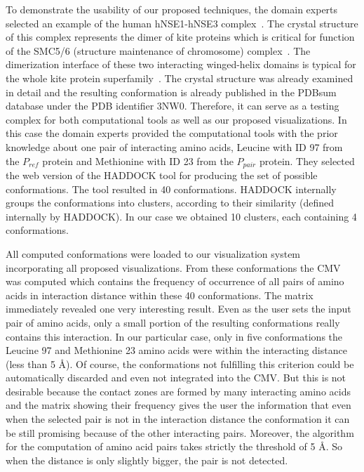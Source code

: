 \documentclass[journal]{vgtc}                %
\begin{document}
To demonstrate the usability of our proposed techniques, the domain experts selected an example of the human hNSE1-hNSE3 complex~\cite{Doyle2010}.
The crystal structure of this complex represents the dimer of kite proteins which is critical for function of the SMC5/6 (structure maintenance of chromosome) complex~\cite{Zabrady2016}. 
The dimerization interface of these two interacting winged-helix domains is typical for the whole kite protein superfamily~\cite{Palecek2015}.
The crystal structure was already examined in detail and the resulting conformation is already published in the PDBsum database under the PDB identifier 3NW0. 
Therefore, it can serve as a testing complex for both computational tools as well as our proposed visualizations.
In this case the domain experts provided the computational tools with the prior knowledge about one pair of interacting amino acids, Leucine with ID 97 from the $P_{ref}$ protein and Methionine with ID 23 from the $P_{pair}$ protein.
They selected the web version of the HADDOCK tool for producing the set of possible conformations. 
The tool resulted in 40 conformations.
HADDOCK internally groups the conformations into clusters, according to their similarity (defined internally by HADDOCK).
In our case we obtained 10 clusters, each containing 4 conformations.

All computed conformations were loaded to our visualization system incorporating all proposed visualizations.
From these conformations the CMV was computed which contains the frequency of occurrence of all pairs of amino acids in interaction distance within these 40 conformations.
The matrix immediately revealed one very interesting result.
Even as the user sets the input pair of amino acids, only a small portion of the resulting conformations really contains this interaction.
In our particular case, only in five conformations the Leucine 97 and Methionine 23 amino acids were within the interacting distance (less than 5 \AA ).
Of course, the conformations not fulfilling this criterion could be automatically discarded and even not integrated into the CMV.
But this is not desirable because the contact zones are formed by many interacting amino acids and the matrix showing their frequency gives the user the information that even when the selected pair is not in the interaction distance the conformation it can be still promising because of the other interacting pairs.
Moreover, the algorithm for the computation of amino acid pairs takes strictly the threshold of 5 \AA.
So when the distance is only slightly bigger, the pair is not detected.
\end{document}
